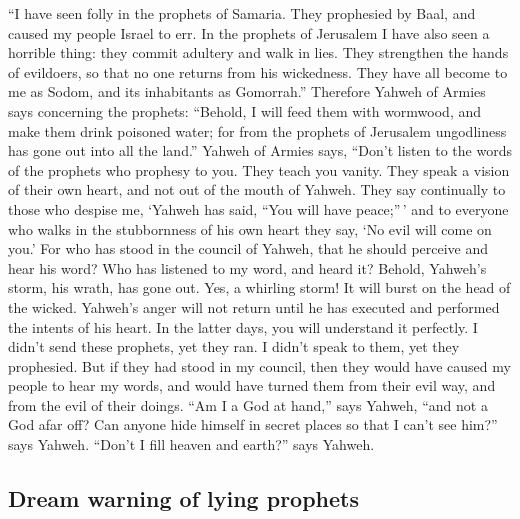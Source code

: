 ``I have seen folly in the prophets of Samaria. They
prophesied by Baal, and caused my people Israel to err. 
In the prophets of Jerusalem I have also seen a horrible thing: they
commit adultery and walk in lies. They strengthen the hands of
evildoers, so that no one returns from his wickedness. They have all
become to me as Sodom, and its inhabitants as Gomorrah.''
 Therefore Yahweh of Armies says concerning the prophets:
``Behold, I will feed them with wormwood, and make them drink poisoned
water; for from the prophets of Jerusalem ungodliness has gone out into
all the land.''  Yahweh of Armies says, ``Don't listen to
the words of the prophets who prophesy to you. They teach you vanity.
They speak a vision of their own heart, and not out of the mouth of
Yahweh.  They say continually to those who despise me,
`Yahweh has said, ``You will have peace;''\,' and to everyone who walks
in the stubbornness of his own heart they say, `No evil will come on
you.'  For who has stood in the council of Yahweh, that
he should perceive and hear his word? Who has listened to my word, and
heard it?  Behold, Yahweh's storm, his wrath, has gone
out. Yes, a whirling storm! It will burst on the head of the wicked.
 Yahweh's anger will not return until he has executed and
performed the intents of his heart. In the latter days, you will
understand it perfectly.  I didn't send these prophets,
yet they ran. I didn't speak to them, yet they prophesied.
 But if they had stood in my council, then they would
have caused my people to hear my words, and would have turned them from
their evil way, and from the evil of their doings.  ``Am
I a God at hand,'' says Yahweh, ``and not a God afar off?
 Can anyone hide himself in secret places so that I can't
see him?'' says Yahweh. ``Don't I fill heaven and earth?'' says Yahweh.

\hypertarget{dream-warning-of-lying-prophets}{%
\subsection{Dream warning of lying
prophets}\label{dream-warning-of-lying-prophets}}

